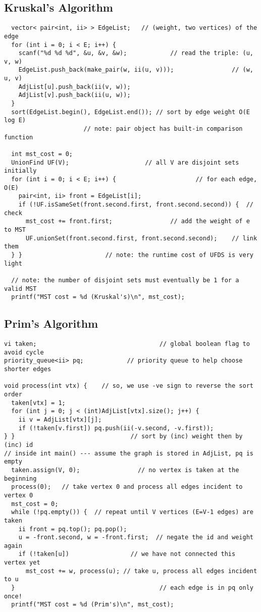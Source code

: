 \documentclass[letterpaper]{article}
\begin{document}
\subsection{Kruskal's Algorithm}
\begin{lstlisting}
  vector< pair<int, ii> > EdgeList;   // (weight, two vertices) of the edge
  for (int i = 0; i < E; i++) {
    scanf("%d %d %d", &u, &v, &w);            // read the triple: (u, v, w)
    EdgeList.push_back(make_pair(w, ii(u, v)));                // (w, u, v)
    AdjList[u].push_back(ii(v, w));
    AdjList[v].push_back(ii(u, w));
  }
  sort(EdgeList.begin(), EdgeList.end()); // sort by edge weight O(E log E)
                      // note: pair object has built-in comparison function

  int mst_cost = 0;
  UnionFind UF(V);                     // all V are disjoint sets initially
  for (int i = 0; i < E; i++) {                      // for each edge, O(E)
    pair<int, ii> front = EdgeList[i];
    if (!UF.isSameSet(front.second.first, front.second.second)) {  // check
      mst_cost += front.first;                // add the weight of e to MST
      UF.unionSet(front.second.first, front.second.second);    // link them
  } }                       // note: the runtime cost of UFDS is very light

  // note: the number of disjoint sets must eventually be 1 for a valid MST
  printf("MST cost = %d (Kruskal's)\n", mst_cost);
\end{lstlisting}

\subsection{Prim's Algorithm}
\begin{lstlisting}
vi taken;                                  // global boolean flag to avoid cycle
priority_queue<ii> pq;            // priority queue to help choose shorter edges

void process(int vtx) {    // so, we use -ve sign to reverse the sort order
  taken[vtx] = 1;
  for (int j = 0; j < (int)AdjList[vtx].size(); j++) {
    ii v = AdjList[vtx][j];
    if (!taken[v.first]) pq.push(ii(-v.second, -v.first));
} }                                // sort by (inc) weight then by (inc) id
// inside int main() --- assume the graph is stored in AdjList, pq is empty
  taken.assign(V, 0);                // no vertex is taken at the beginning
  process(0);   // take vertex 0 and process all edges incident to vertex 0
  mst_cost = 0;
  while (!pq.empty()) {  // repeat until V vertices (E=V-1 edges) are taken
    ii front = pq.top(); pq.pop();
    u = -front.second, w = -front.first;  // negate the id and weight again
    if (!taken[u])                 // we have not connected this vertex yet
      mst_cost += w, process(u); // take u, process all edges incident to u
  }                                        // each edge is in pq only once!
  printf("MST cost = %d (Prim's)\n", mst_cost);
\end{lstlisting}
\newpage
\end{document}
